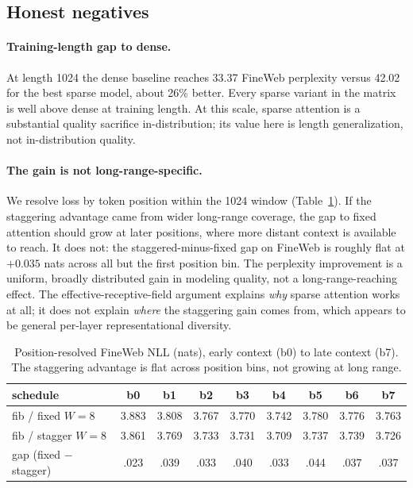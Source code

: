 \documentclass[11pt]{article}
\begin{document}
\subsection{Honest negatives}
\label{sec:negatives}

\paragraph{Training-length gap to dense.}
At length 1024 the dense baseline reaches 33.37 FineWeb perplexity versus 42.02
for the best sparse model, about 26\% better. Every sparse variant in the matrix
is well above dense at training length. At this scale, sparse attention is a
substantial quality sacrifice in-distribution; its value here is length
generalization, not in-distribution quality.

\paragraph{The gain is not long-range-specific.}
We resolve loss by token position within the 1024 window
(Table~\ref{tab:posloss}). If the staggering advantage came from wider long-range
coverage, the gap to fixed attention should grow at later positions, where more
distant context is available to reach. It does not: the staggered-minus-fixed gap
on FineWeb is roughly flat at $+0.035$ nats across all but the first position
bin. The perplexity improvement is a uniform, broadly distributed gain in
modeling quality, not a long-range-reaching effect. The effective-receptive-field
argument explains \emph{why} sparse attention works at all; it does not explain
\emph{where} the staggering gain comes from, which appears to be general
per-layer representational diversity.

\begin{table}[htbp]
\centering
\small
\begin{tabular}{lcccccccc}
\toprule
schedule & b0 & b1 & b2 & b3 & b4 & b5 & b6 & b7 \\
\midrule
fib / fixed $W{=}8$    & 3.883 & 3.808 & 3.767 & 3.770 & 3.742 & 3.780 & 3.776 & 3.763 \\
fib / stagger $W{=}8$  & 3.861 & 3.769 & 3.733 & 3.731 & 3.709 & 3.737 & 3.739 & 3.726 \\
\addlinespace
gap (fixed $-$ stagger) & .023 & .039 & .033 & .040 & .033 & .044 & .037 & .037 \\
\bottomrule
\end{tabular}
\caption{Position-resolved FineWeb NLL (nats), early context (b0) to late
context (b7). The staggering advantage is flat across position bins, not growing
at long range.}
\label{tab:posloss}
\end{table}
\end{document}
